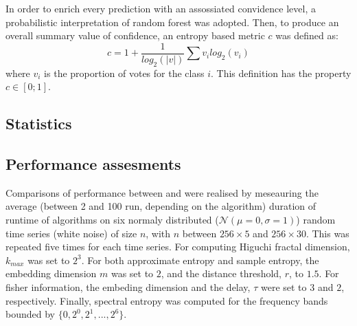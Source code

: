 In order to enrich every prediction with an assossiated convidence level, a probabilistic interpretation of random forest was adopted\citationneeded{}.
Then, to produce an overall summary value of confidence, an entropy based metric $c$ was defined as:
\begin{equation}
c = 1 + \frac{1}{log_2(|v|)}\sum{v_i  log_2(v_i)}
\label{eq:entropy}
\end{equation}
where $v_i$ is the proportion of votes for the class $i$. This definition has the property $c \in [0;1]$.

\subsection{Statistics}


\subsection{Performance assesments}
Comparisons of performance between \pr{} and \pyeeg{} were realised by meseauring the average (between 2 and 100 run, depending on the algorithm) duration of runtime of algorithms on six
normaly distributed ($\mathcal{N}(\mu=0,\sigma=1)$) random time series (\ie white noise) of size $n$,
with $n$ between $256 \times{} 5$ and $256 \times{} 30$.
This was repeated five times for each time series.
For computing  Higuchi fractal dimension, $k_{max}$ was set to $2^3$.
For both approximate entropy and sample entropy, the embedding dimension $m$ was set to $2$, and the distance threshold, $r$, to $1.5$.
For fisher information, the embeding dimension and the delay, $\tau$ were set to $3$ and $2$, respectively.
Finally, spectral entropy was computed for the frequency bands bounded by $\{0, 2^0, 2^1, ..., 2^6\}$.



